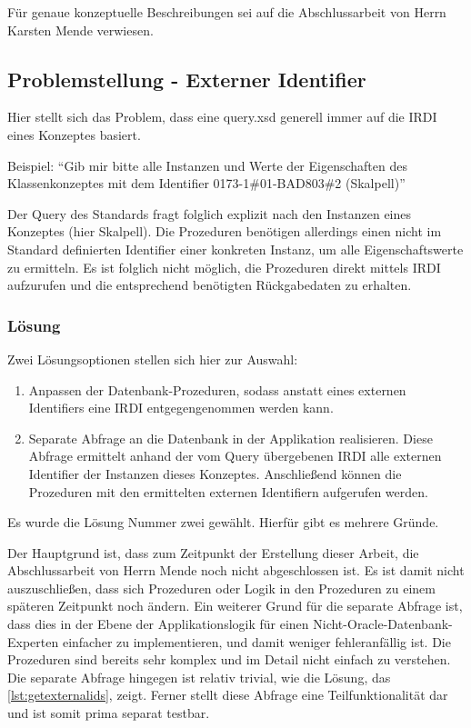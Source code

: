 Für genaue konzeptuelle Beschreibungen sei auf die Abschlussarbeit von Herrn Karsten Mende verwiesen.

\subsection{Problemstellung - Externer Identifier}\label{sec:problemidentifier}

Hier stellt sich das Problem, dass eine query.xsd generell immer auf die \gls{IRDI} eines Konzeptes basiert.

Beispiel: \enquote{Gib mir bitte alle Instanzen und Werte der Eigenschaften des Klassenkonzeptes mit dem Identifier 0173-1\#01-BAD803\#2 (Skalpell)}

Der Query des Standards fragt folglich explizit nach den Instanzen eines Konzeptes (hier Skalpell). Die Prozeduren benötigen allerdings einen nicht im Standard definierten Identifier einer konkreten Instanz, um alle Eigenschaftswerte zu ermitteln. Es ist folglich nicht möglich, die Prozeduren direkt mittels \gls{IRDI} aufzurufen und die entsprechend benötigten Rückgabedaten zu erhalten.

\subsubsection{Lösung}

Zwei Lösungsoptionen stellen sich hier zur Auswahl:
\begin{enumerate}
\item Anpassen der Datenbank-Prozeduren, sodass anstatt eines externen Identifiers eine \gls{IRDI} entgegengenommen werden kann.
\item Separate Abfrage an die Datenbank in der Applikation realisieren. Diese Abfrage ermittelt anhand der vom Query übergebenen \gls{IRDI} alle externen Identifier der Instanzen dieses Konzeptes. Anschließend können die Prozeduren mit den ermittelten externen Identifiern aufgerufen werden.   
\end{enumerate}

Es wurde die Lösung Nummer zwei gewählt. Hierfür gibt es mehrere Gründe. 

Der Hauptgrund ist, dass zum Zeitpunkt der Erstellung dieser Arbeit, die Abschlussarbeit von Herrn Mende noch nicht abgeschlossen ist. Es ist damit nicht auszuschließen, dass sich Prozeduren oder Logik in den Prozeduren zu einem späteren Zeitpunkt noch ändern.
Ein weiterer Grund für die separate Abfrage ist, dass dies in der Ebene der Applikationslogik für einen Nicht-\gls{Oracle}-Datenbank-Experten einfacher zu implementieren, und damit weniger fehleranfällig ist. Die Prozeduren sind bereits sehr komplex und im Detail nicht einfach zu verstehen. Die separate Abfrage hingegen ist relativ trivial, wie die Lösung, das \autoref{lst:getexternalids}, zeigt.
Ferner stellt diese Abfrage eine Teilfunktionalität dar und ist somit prima separat testbar.  

